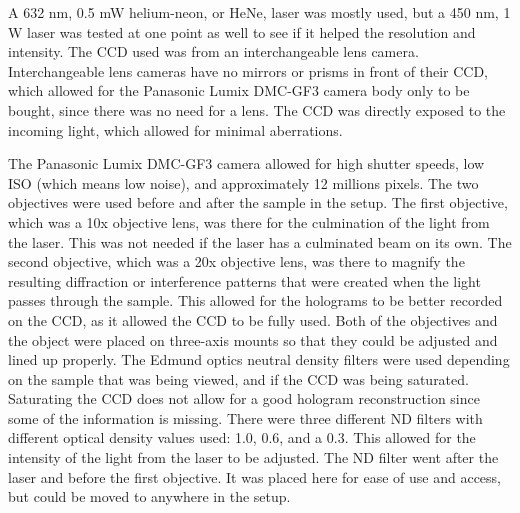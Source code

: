 %
%
%
\clearpage


A 632 nm, 0.5 mW helium-neon, or HeNe, laser was mostly used, but a 450 nm, 1 W laser was tested at one point as
well to see if it helped the resolution and intensity.
The CCD used was from an interchangeable lens camera.
Interchangeable lens cameras have no mirrors or prisms in front of
their CCD\@, which allowed for the Panasonic Lumix DMC-GF3 camera body only to
be bought, since there was no need for a lens. The CCD was directly
exposed to the incoming light, which allowed for minimal aberrations.

The Panasonic Lumix DMC-GF3 camera allowed for high shutter speeds, low ISO
(which means low noise), and approximately 12 millions pixels.
The two objectives were used
before and after the sample in the setup. The first objective, which was a 10x
objective lens, was there for
the culmination of the light from the laser. This was not needed if the laser
has a culminated beam on its own. The second objective, which was a 20x
objective lens, was there to
magnify the resulting diffraction or interference patterns that were created
when the light passes through the sample. This allowed for the holograms to be
better recorded on the CCD, as it allowed the CCD to be fully used.
Both of the objectives and the object were placed on
three-axis mounts so that they could be adjusted and lined up properly.
The Edmund optics neutral density filters were used depending on the sample
that was being viewed, and if the CCD was being saturated. Saturating the CCD does not allow for a good hologram reconstruction
since some of the information is missing.
There were three different ND filters with
different optical density values used: 1.0, 0.6,
and a 0.3. This allowed for the intensity of the light from the laser to be
adjusted.
The ND filter went after the laser
and before the first objective. It was placed here for ease of use and access,
but could be moved to anywhere in the setup.


% 
